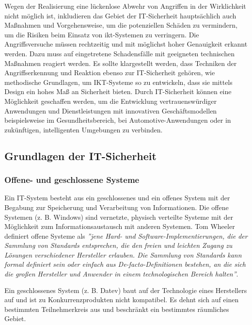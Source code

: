 Wegen der Realisierung eine lückenlose Abwehr von Angriffen in der Wirklichkeit nicht möglich ist, inkludieren das Gebiet der IT-Sicherheit hauptsächlich auch Maßnahmen und Vorgehensweise, um die potenziellen Schäden zu vermindern, um die Risiken beim Einsatz von \gls{ikt}-Systemen zu verringern. Die Angriffsversuche müssen rechtzeitig und mit möglichst hoher Genauigkeit erkannt werden. Dazu muss auf eingetretene Schadensfälle mit geeigneten technischen Maßnahmen reagiert werden. Es sollte klargestellt werden, dass Techniken der Angriffserkennung und Reaktion ebenso zur IT-Sicherheit gehören, wie methodische Grundlagen, um IKT-Systeme so zu entwickeln, dass sie mittels Design ein hohes Maß an Sicherheit bieten. Durch IT-Sicherheit können eine Möglichkeit geschaffen werden, um die Entwicklung vertrauenswürdiger Anwendungen und Dienstleistungen mit innovativen Geschäftsmodellen beispielsweise im Gesundheitsbereich, bei Automotive-Anwendungen oder in zukünftigen, intelligenten Umgebungen zu verbinden\cite[20--21]{eckert2013sicherheit}.

\subsection{Grundlagen der IT-Sicherheit}

\subsubsection{Offene- und geschlossene Systeme}

Ein IT-System besteht aus ein geschlossenes und ein offenes System mit der Begabung zur Speicherung und Verarbeitung von Informationen. Die offene Systemen (z. B. Windows) sind vernetzte, physisch verteilte Systeme mit der Möglichkeit zum Informationsaustausch mit anderen Systemen\cite[22--23]{eckert2013sicherheit}. Tom Wheeler definiert offene Systeme als \emph{''jene Hard- und Software-Implementierungen, die der Sammlung von Standards entsprechen, die den freien und leichten Zugang zu Lösungen verschiedener Hersteller erlauben. Die Sammlung von Standards kann formal definiert sein oder einfach aus De-facto-Definitionen bestehen, an die sich die großen Hersteller und Anwender in einem technologischen Bereich halten''}\cite[4]{wheeler2013offene}. 

Ein geschlossenes System (z. B. Datev) baut auf der Technologie eines Herstellers auf und ist zu Konkurrenzprodukten nicht kompatibel.  Es dehnt sich auf einen bestimmten Teilnehmerkreis aus und beschränkt ein bestimmtes räumliches Gebiet\cite[22--23]{eckert2013sicherheit}.

